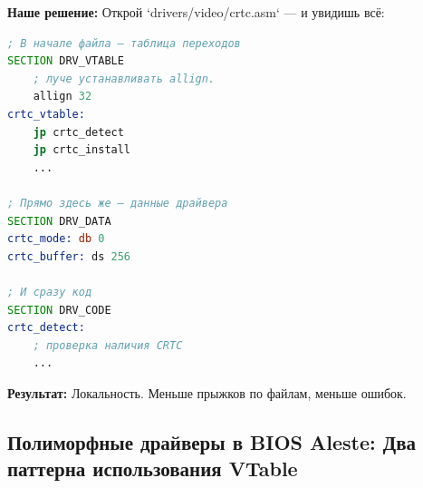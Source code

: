 \documentclass[11pt,a4paper]{scrartcl}
\begin{document}
\textbf{Наше решение:} Открой `drivers/video/crtc.asm` — и увидишь всё:

\begin{lstlisting}[language=asm,numbers=none]
; В начале файла — таблица переходов
SECTION DRV_VTABLE
    ; луче устанавливать allign.
    allign 32
crtc_vtable:
    jp crtc_detect
    jp crtc_install
    ...

; Прямо здесь же — данные драйвера  
SECTION DRV_DATA
crtc_mode: db 0
crtc_buffer: ds 256

; И сразу код
SECTION DRV_CODE
crtc_detect:
    ; проверка наличия CRTC
    ...
\end{lstlisting}

\textbf{Результат:} Локальность. Меньше прыжков по файлам, меньше ошибок.
\subsection{Полиморфные драйверы в BIOS Aleste: Два паттерна использования VTable}
\label{sec:org00e07db}
\end{document}

